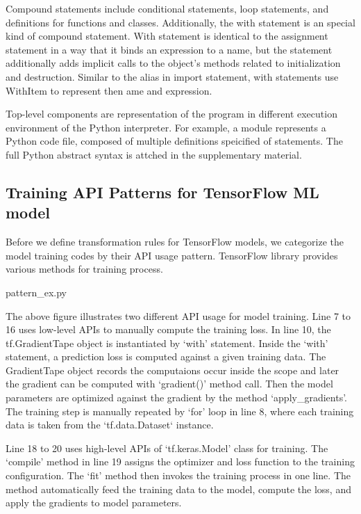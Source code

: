 Compound statements include conditional statements, loop statements,
and definitions for functions and classes.
Additionally, the with statement is an special kind of compound statement.
With statement is identical to the assignment statement 
in a way that it binds an expression to a name, 
but the statement additionally adds implicit calls
to the object's methods related to initialization and destruction.
Similar to the alias in import statement,
with statements use WithItem to represent then ame and expression.

Top-level components are representation of the program
in different execution environment of the Python interpreter.
For example, a module represents a Python code file, composed of
multiple definitions speicified of statements. 
The full Python abstract syntax is attched in the supplementary material.

\subsection{Training API Patterns for TensorFlow ML model}

Before we define transformation rules for TensorFlow models,
we categorize the model training codes by their API usage pattern.
TensorFlow library provides various methods for training process.



{pattern_ex.py}

The above figure illustrates two different API usage for model training.
Line 7 to 16 uses low-level APIs to manually compute the training loss.
In line 10, the tf.GradientTape object is instantiated by `with' statement.
Inside the `with' statement, a prediction loss is computed against
a given training data.
The GradientTape object records the computaions occur inside the scope
and later the gradient can be computed with `gradient()' method call.
Then the model parameters are optimized against the gradient
by the method `apply\_gradients'.
The training step is manually repeated by `for' loop in line 8,
where each training data is taken from the `tf.data.Dataset` instance.

Line 18 to 20 uses high-level APIs of `tf.keras.Model' class for training.
The `compile' method in line 19 assigns the optimizer and loss
function to the training configuration.
The `fit' method then invokes the training process in one line.
The method automatically feed the training data to the model,
compute the loss, and apply the gradients to model parameters.

